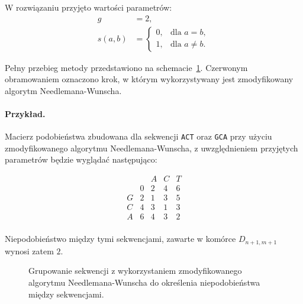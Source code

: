             W rozwiązaniu przyjęto wartości parametrów:
            \begin{align*}
                g &= 2, \\
                s(a, b) &= \begin{cases}
                    0, & \text{dla } a = b, \\
                    1, & \text{dla } a \neq b.
                \end{cases}
            \end{align*}

            Pełny przebieg metody przedstawiono na schemacie~\ref{Picture:Cluster:NeedlemanWunsch}. Czerwonym obramowaniem oznaczono krok, w którym wykorzystywany jest zmodyfikowany algorytm Needlemana-Wunscha.

            \paragraph{Przykład.} Macierz podobieństwa zbudowana dla sekwencji \texttt{ACT} oraz \texttt{GCA} przy użyciu zmodyfikowanego algorytmu Needlemana-Wunscha, z uwzględnieniem przyjętych parametrów będzie wyglądać następująco:

            \[
                \begin{matrix}
                            &        & A      & C      & T      \\
                            &      0 &      2 &      4 &      6 \\
                     G      &      2 &      1 &      3 &      5 \\
                     C      &      4 &      3 &      1 &      3 \\
                     A      &      6 &      4 &      3 &      2 \\
                \end{matrix}
            \]

            Niepodobieństwo między tymi sekwencjami, zawarte w komórce $D_{n + 1, m + 1}$ wynosi zatem $2$.

            \begin{figure}
                \begin{center}
                    
                \end{center}
                \caption{
                    Grupowanie sekwencji z wykorzystaniem zmodyfikowanego algorytmu Needlemana-Wunscha do określenia niepodobieństwa między sekwencjami.
                }\label{Picture:Cluster:NeedlemanWunsch}
            \end{figure}

